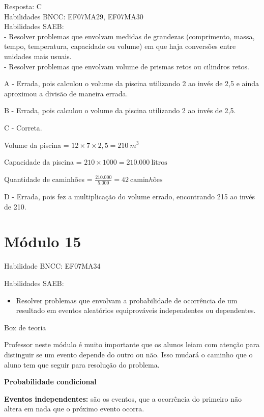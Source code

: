 Resposta: C\\
Habilidades BNCC: EF07MA29, EF07MA30\\
Habilidades SAEB:\\
- Resolver problemas que envolvam medidas de grandezas (comprimento,
massa, tempo, temperatura, capacidade ou volume) em que haja conversões
entre unidades mais usuais.\\
- Resolver problemas que envolvam volume de prismas retos ou cilindros
retos.

A - Errada, pois calculou o volume da piscina utilizando 2 ao invés de
2,5 e ainda aproximou a divisão de maneira errada.

B - Errada, pois calculou o volume da piscina utilizando 2 ao invés de
2,5.

C - Correta.

Volume da piscina = \(12 \times 7 \times 2,5 = 210\ m^{3}\ \)

Capacidade da piscina = \(210 \times 1000 = 210.000\ \text{litros}\)

Quantidade de caminhões =
\(\frac{210.000}{5.000} = 42\ \text{camin}hõ\text{es}\)

D - Errada, pois fez a multiplicação do volume errado, encontrando 215
ao invés de 210.

\hypertarget{muxf3dulo-15}{%
\section{Módulo 15}\label{muxf3dulo-15}}

Habilidade BNCC: EF07MA34

Habilidades SAEB:

\begin{itemize}
\tightlist
\item
  Resolver problemas que envolvam a probabilidade de ocorrência de um
  resultado em eventos aleatórios equiprováveis independentes ou
  dependentes.
\end{itemize}

Box de teoria

Professor neste módulo é muito importante que os alunos leiam com
atenção para distinguir se um evento depende do outro ou não. Isso
mudará o caminho que o aluno tem que seguir para resolução do problema.

\textbf{{Probabilidade condicional}}

\textbf{Eventos independentes:} são os eventos, que a ocorrência do
primeiro não altera em nada que o próximo evento ocorra.

